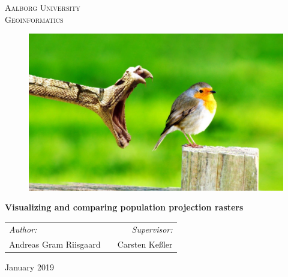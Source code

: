 \thispagestyle{empty}

\begin{center}
\textsc{\LARGE Aalborg University}\\%
\textsc{\Large Geoinformatics}\\[1.cm]
\end{center}

\begin{figure} [H]
	\centering
	\includegraphics[width=1\textwidth]{Pictures/Example.jpg}	
	\label{forside}
\end{figure}

\vfill
\begin{center}
{ \huge \bfseries {Visualizing and comparing population projection rasters}}\\[0.2cm]
\end{center}

\begin{tabularx}{\textwidth}{l X r}
	\hline
	\emph{Author:} & & \emph{Supervisor:}\\
	Andreas Gram Riisgaard	&	 &	 Carsten Ke{\ss}ler \\
	\hline
\end{tabularx}

\vfill

{\large January 2019}

\frontmatter

